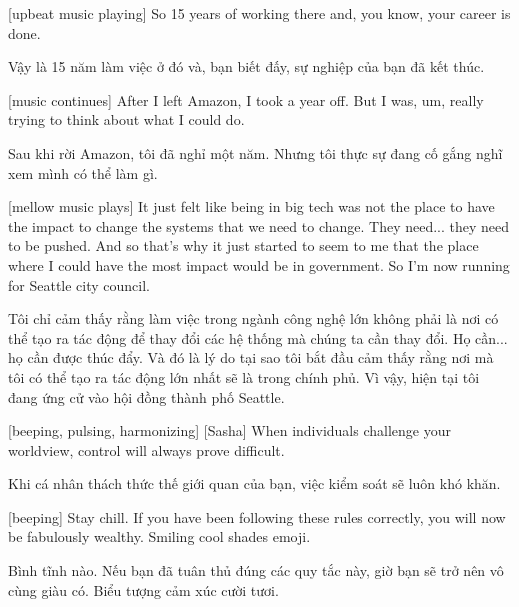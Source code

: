 \documentclass[a4paper]{article}
\begin{document}
	[upbeat music playing]
	So 15 years of working there and, you know, your career is done.
	
	\begin{vietnamese-v2}
		Vậy là 15 năm làm việc ở đó và, bạn biết đấy, sự nghiệp của bạn đã kết thúc.
	\end{vietnamese-v2}
	
	[music continues]
	After I left Amazon, I took a year off.
	But I was, um, really trying to think about what I could do.
	
	\begin{vietnamese-v2}
		Sau khi rời Amazon, tôi đã nghỉ một năm.
		Nhưng tôi thực sự đang cố gắng nghĩ xem mình có thể làm gì.
	\end{vietnamese-v2}
	
	[mellow music plays]
	It just felt like being in big tech was not the place to have the impact to change the systems that we need to change.
	They need... they need to be pushed.
	And so that's why it just started to seem to me that the place where I could have the most impact would be in government.
	So I'm now running for Seattle city council.
	
	\begin{vietnamese-v2}
		Tôi chỉ cảm thấy rằng làm việc trong ngành công nghệ lớn không phải là nơi có thể tạo ra tác động để thay đổi các hệ thống mà chúng ta cần thay đổi.
		Họ cần... họ cần được thúc đẩy.
		Và đó là lý do tại sao tôi bắt đầu cảm thấy rằng nơi mà tôi có thể tạo ra tác động lớn nhất sẽ là trong chính phủ.
		Vì vậy, hiện tại tôi đang ứng cử vào hội đồng thành phố Seattle.
	\end{vietnamese-v2}
	
	
	[beeping, pulsing, harmonizing]
	[Sasha] When individuals challenge your worldview, control will always prove difficult.
	
	\begin{vietnamese-v2}
		 Khi cá nhân thách thức thế giới quan của bạn, việc kiểm soát sẽ luôn khó khăn.
	\end{vietnamese-v2}
	
	[beeping]
	Stay chill.
	If you have been following these rules correctly, you will now be fabulously wealthy.
	Smiling cool shades emoji.
	
	\begin{vietnamese-v2}
		[bíp]
		Bình tĩnh nào.
		Nếu bạn đã tuân thủ đúng các quy tắc này, giờ bạn sẽ trở nên vô cùng giàu có.
		Biểu tượng cảm xúc cười tươi.
	\end{vietnamese-v2}
	
\end{document}
